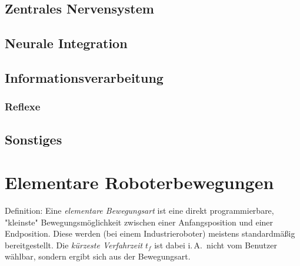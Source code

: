 \documentclass[a4paper, 11pt, accentcolor = tud3b]{tudreport}
\newcommand{\iA}{i.\,A.~}
\begin{document}
			\subsection{Zentrales Nervensystem} %

			\subsection{Neurale Integration} %

			\subsection{Informationsverarbeitung} %

				\subsubsection{Reflexe} %

			\subsection{Sonstiges} %

		\section{Elementare Roboterbewegungen}
			Definition: Eine \emph{elementare Bewegungsart} ist eine direkt programmierbare, "kleinste" Bewegungsmöglichkeit zwischen einer Anfangsposition und einer Endposition. Diese werden (bei einem Industrieroboter) meistens standardmäßig bereitgestellt. Die \emph{kürzeste Verfahrzeit} \(t_f\) ist dabei \iA nicht vom Benutzer wählbar, sondern ergibt sich aus der Bewegungsart.
			
\end{document}
